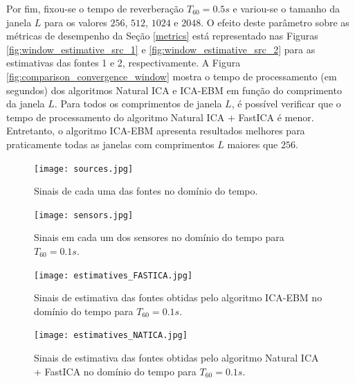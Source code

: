     Por fim, fixou-se o tempo de reverberação $T_{60}=0.5s$ e variou-se o tamanho da janela $L$ para os valores $256$, $512$, $1024$ e $2048$. O efeito deste parâmetro sobre as métricas de desempenho da Seção \ref{metrics} está representado nas Figuras \ref{fig:window_estimative_src_1} e \ref{fig:window_estimative_src_2} para as estimativas das fontes 1 e 2, respectivamente. A Figura \ref{fig:comparison_convergence_window} mostra o tempo de processamento (em segundos) dos algoritmos Natural ICA e ICA-EBM em função do comprimento da janela $L$. Para todos os comprimentos de janela $L$, é possível verificar que o tempo de processamento do algoritmo Natural ICA + FastICA é menor. Entretanto, o algoritmo ICA-EBM apresenta resultados melhores para praticamente todas as janelas com comprimentos $L$ maiores que $256$.
    
    \begin{figure}
        \centering
        \texttt{[image: sources.jpg]}
            \caption{Sinais de cada uma das fontes no domínio do tempo.}
        \label{fig:sources}
        \texttt{[image: sensors.jpg]}
            \caption{Sinais em cada um dos sensores no domínio do tempo para $T_{60} = 0.1s$.}
        \label{fig:sensors}
    \end{figure}
    
    \begin{figure}
        \centering
        \texttt{[image: estimatives\_FASTICA.jpg]}
            \caption{Sinais de estimativa das fontes obtidas pelo algoritmo ICA-EBM no domínio do tempo para $T_{60} = 0.1s$.}
        \label{fig:icaebm}
        \texttt{[image: estimatives\_NATICA.jpg]}
            \caption{Sinais de estimativa das fontes obtidas pelo algoritmo Natural ICA + FastICA  no domínio do tempo para $T_{60} = 0.1s$.}
        \label{fig:natica}
    \end{figure}
    
